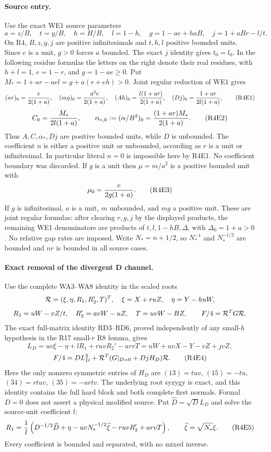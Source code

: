 \paragraph{Source entry.}
Use the exact WE1 source parameters
\[
 a=z/B,\quad t=y/B,\quad h=H/B,\quad l=1-h,
 \quad g=1-ae+haB,\quad j=1+aBr-l/t.
\]
On R4, $B,z,y,j$ are positive infinitesimals and $t,h,l$ positive
bounded units. Since $e$ is a unit, $g>0$ forces $a$ bounded.
The exact $j$ identity gives $t_0=l_0$. In the following residue
formulas the letters on the right denote their real residues, with
$h+l=1$, $e=1-r$, and $g=1-ae\ge0$. Put
$M_*=1+ar-ael=g+a(r+eh)>0$. Joint regular reduction of WE1 gives
\[
 (nr)_0={e\over2(1+a)},\quad
 (mg)_0={a^2e\over2(1+a)},\quad
 (Ah)_0={l(1+ar)\over2(1+a)},\quad
 (Dj)_0={1+ar\over2l(1+a)},                         \tag{R4E1}
\]
\[
 C_0={M_*\over2l(1+a)},\qquad
 \alpha_{*,0}:=(\alpha/B^2)_0={(1+ar)M_*\over2(1+a)}.\tag{R4E2}
\]
Thus $A,C,\alpha_*,Dj$ are positive bounded units, while $D$ is
unbounded. The coefficient $n$ is either a positive unit or unbounded,
according as $r$ is a unit or infinitesimal. In particular literal
$n=0$ is impossible here by R4E1. No coefficient boundary was discarded.
If $g$ is a unit then $\mu=m/a^2$ is a positive bounded unit with
\[
                 \mu_0={e\over2g(1+a)}.              \tag{R4E3}
\]
If $g$ is infinitesimal, $a$ is a unit, $m$ unbounded, and $mg$ a
positive unit. These are joint regular formulas: after clearing $r,g,j$
by the displayed products, the remaining WE1 denominators are products
of $t,l,1-hB,\Delta$, with $\Delta_0=1+a>0$. No relative gap rates
are imposed. Write $N_*=n+1/2$, so $N_*^{-1}$ and $N_*^{-1/2}$ are
bounded and $nr$ is bounded in all source cases.

\paragraph{Exact removal of the divergent D channel.}
Use the complete WA3--WA8 identity in the scaled roots
\[
 {\cal R}=(\xi,\eta,R_1,R_2',T)^T,
 \quad \xi=X+ruZ,\quad\eta=Y-huW,
\]
\[
 R_1=uW-vZ/t,\quad R_2'=avW-uZ,\quad T=uvW-BZ,
 \qquad F/4={\cal R}^TG{\cal R}.
\]
The exact full-matrix identity RD3--RD6, proved independently of any
small-$h$ hypothesis in the R17 small-$r$ R8 lemma, gives
\[
 L_D=uv\xi-\eta+lR_1+ruvR_2'-arvT
     =uW+uvX-Y-vZ+jvZ,
\]
\[
 F/4=D L_D^2+{\cal R}^T(G|_{D=0}+DjH_D){\cal R}.       \tag{R4E4}
\]
Here the only nonzero symmetric entries of $H_D$ are
$(13)=tuv$, $(15)=-tu$, $(34)=rtuv$, $(35)=-artv$.
The underlying root syzygy is exact, and this identity contains the
full hard block and both complete first normals. Formal $D=0$ does
not assert a physical modified source. Put $\widehat D=\sqrt D L_D$
and solve the source-unit coefficient $l$:
\[
 R_1={1\over l}\left(D^{-1/2}\widehat D+\eta
       -uvN_*^{-1/2}\widehat\xi-ruvR_2'+arvT\right),
 \qquad\widehat\xi=\sqrt{N_*}\xi.                  \tag{R4E5}
\]
Every coefficient is bounded and separated, with no mixed inverse.

